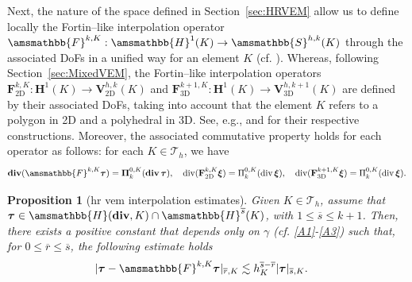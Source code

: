 \documentclass[fleqn,a4paper]{cas-sc}
\newcommand\vdiv{\mathop{\mathrm{div}}\nolimits}
\newcommand\bdiv{\mathop{\mathbf{div}}\nolimits}
\newcommand{\bF}{\mathbf{F}}
\newcommand{\bbS}{\amsmathbb{S}}
\newcommand{\bxi}{\boldsymbol{\xi}}
\newcommand{\bPi}{\boldsymbol{\Pi}}
\newcommand{\0}{\boldsymbol{0}}
\newcommand\cT{\mathcal{T}}
\newcommand\bV{\mathbf{V}}
\newcommand\bbH{\amsmathbb{H}}
\newcommand\bbF{\amsmathbb{F}}
\newcommand\btau{\boldsymbol{\tau}}
\numberwithin{equation}{section}
\numberwithin{figure}{section}
\newtheorem{proposition}[theorem]{Proposition}
\begin{document}
Next, {the} nature of the space defined in Section~\ref{sec:HRVEM} allow us to define locally the Fortin--like interpolation operator $\bbF^{k,K}:\bbH^{1}(K)\rightarrow \bbS^{h,k}(K)$ through the associated DoFs in a unified way for an element $K$ ({cf.} \cite{botti25}). Whereas, following Section~\ref{sec:MixedVEM}, the Fortin--like interpolation operators $\bF_{\text{2D}}^{k,K}:\mathbf{H}^{1}(K)\rightarrow \bV_{\text{2D}}^{h,k}(K)$ and $\bF_{\text{3D}}^{k+1,K}:\mathbf{H}^{1}(K)\rightarrow \bV_{\text{3D}}^{h,k+1}(K)$ are defined by their associated DoFs, taking into account that the element $K$ refers to a polygon in 2D and a polyhedral in 3D. See, e.g.,  \cite[Section 3.2]{beirao16} and \cite[Section 4.1]{beirao22} for their respective constructions. Moreover, the associated commutative property holds for each operator as follows: for each $K\in \cT_h$, we have
\begin{align}\label{commutative_property}
    \bdiv(\bbF^{k,K}\btau) = \bPi^{0,K}_k (\bdiv\btau), \quad \vdiv (\bF_{\text{2D}}^{k,K}\bxi) = \Pi_{k}^{0,K} (\vdiv \bxi ), \quad \vdiv (\bF_{\text{3D}}^{k+1,K}\bxi) = \Pi_{k}^{0,K} (\vdiv \bxi).
\end{align}

\begin{proposition}[\gls{hr} \gls{vem} interpolation estimates] \label{prop:est_int_HR}
    Given $K\in \cT_h$, assume that $\btau\in  \bbH(\bdiv,K)\cap\bbH^{{\overline{s}}}(K)$, with  $1 \leq {\overline{s}} \leq k+1$. Then, there {exists} a positive constant that depends only on {$\gamma$} ({cf.} \ref{A1}-\ref{A3}) such that, for $0\leq \overline{r}\leq {\overline{s}}$, the following estimate holds
    \begin{align*}
        |\btau - \bbF^{k,K}\btau|_{\overline{r},K} &\lesssim h_K^{{\overline{s}}-\overline{r}}|\btau|_{{\overline{s}},K}.
    \end{align*} 
\end{proposition}
\end{document}
